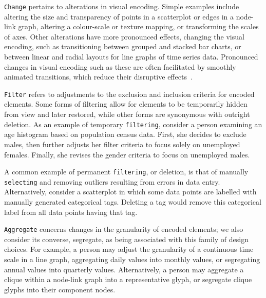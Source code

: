 {\tt Change}
pertains to alterations in visual encoding.
Simple examples include altering the size and transparency of points in a scatterplot or edges in a node-link graph, altering a colour-scale or texture mapping, or transforming the scales of axes.
Other alterations have more pronounced effects, changing the visual encoding, such as transitioning between grouped and stacked bar charts, or between linear and radial layouts for line graphs of time series data.
Pronounced changes in visual encoding such as these are often facilitated by smoothly animated transitions, which reduce their disruptive effects~\cite{Heer2007}.

{\tt Filter}
refers to adjustments to the exclusion and inclusion criteria for encoded elements.
Some forms of filtering allow for elements to be temporarily hidden from view and later restored, while other forms are synonymous with outright deletion.
As an example of temporary {\tt filtering}, consider a person examining an age histogram based on population census data.
First, she decides to exclude males, then further adjusts her filter criteria to focus solely on unemployed females.
Finally, she revises the gender criteria to focus on unemployed males.

A common example of permanent {\tt filtering}, or deletion, is that of manually {\tt selecting} and removing outliers resulting from errors in data entry.
Alternatively, consider a scatterplot in which some data points are labelled with manually generated categorical tags.
Deleting a tag would remove this categorical label from all data points having that tag.

{\tt Aggregate}
concerns changes in the granularity of encoded elements; we also consider its converse, segregate, as being associated with this family of design choices.
For example, a person may adjust the granularity of a continuous time scale in a line graph, aggregating daily values into monthly values, or segregating annual values into quarterly values.
Alternatively, a person may aggregate a clique within a node-link graph into a representative glyph, or segregate clique glyphs into their component nodes.

